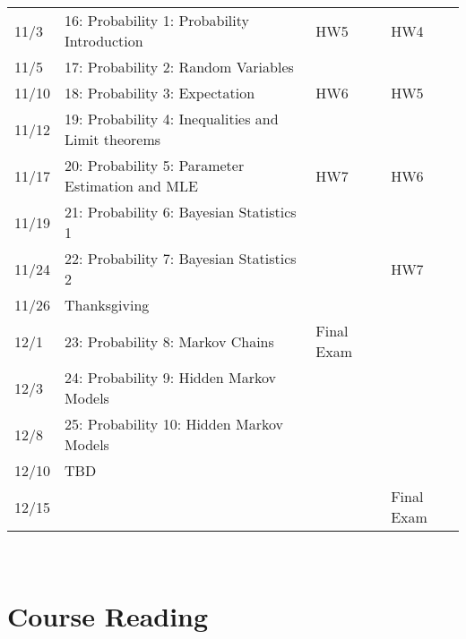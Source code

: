 \documentclass[11pt]{article}
\begin{document}
\begin{centering}
\begin{tabular}{||l|p{3in}|l|l||}
11/3 & 16:  Probability 1: Probability Introduction  &HW5   &HW4   \\ 
11/5 & 17: Probability 2: Random Variables   &  &  \\ 
\hline

11/10 & 18: Probability 3: Expectation &HW6   & HW5\\  
11/12& 19: Probability 4:  Inequalities and Limit theorems   &  &    \\  
\hline
11/17 & 20: Probability 5: Parameter Estimation and MLE &HW7   &HW6 \\  
11/19& 21: Probability 6: Bayesian Statistics 1   &  &   \\  
\hline
11/24 & 22: Probability 7: Bayesian Statistics 2   &   &HW7  \\
11/26 & Thanksgiving &   &  \\  
\hline

12/1 & 23:  Probability 8: Markov Chains  & Final Exam &  \\
12/3 & 24: Probability 9: Hidden Markov Models  &   &  \\ 
\hline
12/8&  25: Probability 10: Hidden Markov Models  &  &  \\
12/10& TBD &  &  \\
\hline
12/15& & & Final Exam\\
\hline\hline

\end{tabular}\\
\end{centering}

\section*{Course Reading}
\end{document}
